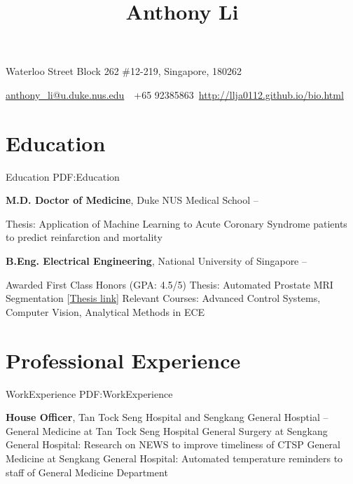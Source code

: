 \documentclass[letterpaper,10pt,oneside]{article}
\newcommand{\CVAuthor}{Anthony Li}
\newcommand{\CVWebpage}{http://llja0112.github.io/bio.html}
\begin{document}

\title{\CVAuthor}

\begin{subtitle}
{Waterloo Street Block 262 \#12-219, Singapore, 180262}
\par
\href{mailto:anthony_li@u.duke.nus.edu}
{anthony\_li@u.duke.nus.edu}
\,\SubBulletSymbol\,
+65 92385863\,
\href{\CVWebpage}
{\CVWebpage}
\end{subtitle}

\begin{body}


\section
{Education}
{Education}
{PDF:Education}

{\textbf{M.D. Doctor of Medicine}, Duke NUS Medical School}
\hfill
{} -- 

\GapNoBreak
\BulletItem
Thesis: Application of Machine Learning to Acute Coronary Syndrome patients to predict 
\newline reinfarction and mortality

\BigGap
{\textbf{B.Eng. Electrical Engineering}, National University of Singapore}
\hfill
{} --

\GapNoBreak
\BulletItem
Awarded First Class Honors (GPA: 4.5/5)
\BulletItem
Thesis: Automated Prostate MRI Segmentation [\href{https://drive.google.com/open?id=0B1GfPKwMcZtpdWp0aUpxMnlKbU1oLVJFbjN3bGwwcXZlVVNJ}{Thesis link}]
\BulletItem
Relevant Courses: Advanced Control Systems, Computer Vision, Analytical Methods in ECE

\section
{Professional Experience}
{WorkExperience}
{PDF:WorkExperience}

{\textbf{House Officer}, Tan Tock Seng Hospital and Sengkang General Hosptial}
\hfill
{} --
\BulletItem
General Medicine at Tan Tock Seng Hospital
\BulletItem
General Surgery at Sengkang General Hospital: Research on NEWS to improve timeliness of CTSP
\BulletItem
General Medicine at Sengkang General Hospital: Automated temperature reminders to staff of General Medicine Department


\end{body}
\end{document}
